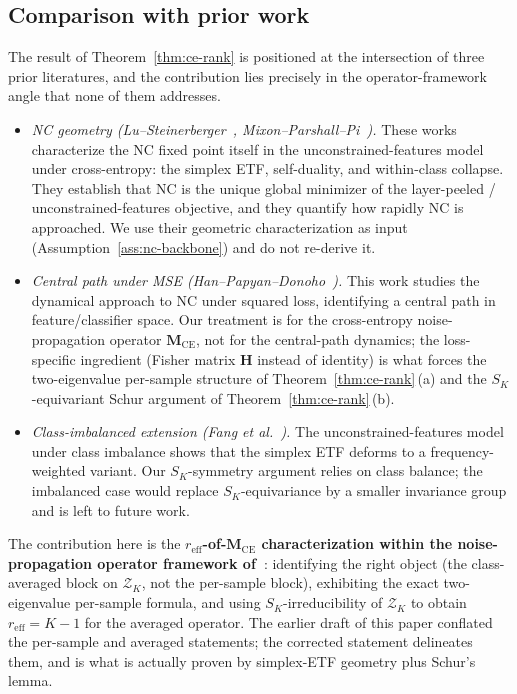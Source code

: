 \documentclass[12pt]{amsart}
\theoremstyle{definition}
\theoremstyle{remark}
\newcommand{\bM}{\mathbf{M}}
\newcommand{\bH}{\mathbf{H}}
\begin{document}
\subsection{Comparison with prior work}\label{subsec:prior-work}

The result of Theorem~\ref{thm:ce-rank} is positioned at the
intersection of three prior literatures, and the contribution lies
precisely in the operator-framework angle that none of them
addresses.
\begin{itemize}
\item \emph{NC geometry (Lu--Steinerberger~\cite{lu2022},
Mixon--Parshall--Pi~\cite{mixon2022}).} These works characterize
the NC fixed point itself in the unconstrained-features model
under cross-entropy: the simplex ETF, self-duality, and within-class
collapse. They establish that NC is the unique global minimizer of
the layer-peeled / unconstrained-features objective, and they
quantify how rapidly NC is approached. We use their geometric
characterization as input (Assumption~\ref{ass:nc-backbone}) and
do not re-derive it.
\item \emph{Central path under MSE (Han--Papyan--Donoho~\cite{han2022}).}
This work studies the dynamical approach to NC under squared loss,
identifying a central path in feature/classifier space. Our
treatment is for the cross-entropy noise-propagation operator
$\bM_{\mathrm{CE}}$, not for the central-path dynamics; the
loss-specific ingredient (Fisher matrix $\bH$ instead of identity)
is what forces the two-eigenvalue per-sample structure of
Theorem~\ref{thm:ce-rank}\,(a) and the $S_{K}$-equivariant Schur
argument of Theorem~\ref{thm:ce-rank}\,(b).
\item \emph{Class-imbalanced extension (Fang et al.~\cite{Fang2021}).}
The unconstrained-features model under class imbalance shows that
the simplex ETF deforms to a frequency-weighted variant. Our
$S_{K}$-symmetry argument relies on class balance; the imbalanced
case would replace $S_{K}$-equivariance by a smaller invariance
group and is left to future work.
\end{itemize}
The contribution here is the
\textbf{$r_{\mathrm{eff}}$-of-$\bM_{\mathrm{CE}}$ characterization
within the noise-propagation operator framework of~\cite{paperA}}:
identifying the right object (the class-averaged block on
$\mathcal{Z}_{K}$, not the per-sample block), exhibiting the exact
two-eigenvalue per-sample formula, and using $S_{K}$-irreducibility
of $\mathcal{Z}_{K}$ to obtain $r_{\mathrm{eff}} = K-1$ for the
averaged operator. The earlier draft of this paper conflated the
per-sample and averaged statements; the corrected statement
delineates them, and is what is actually proven by simplex-ETF
geometry plus Schur's lemma.
\end{document}
